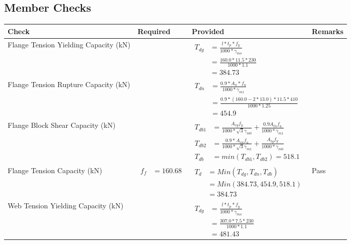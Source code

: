 \documentclass{article}%
\begin{document}
\subsection{Member Checks}%
\label{subsec:MemberChecks}%
\renewcommand{\arraystretch}{1.2}%
\begin{longtable}{|p{4cm}|p{6cm}|p{5.5cm}|p{1.5cm}|}%
\hline%
\rowcolor{OsdagGreen}%
Check&Required&Provided&Remarks\\%
\hline%
\endhead%
\hline%
Flange Tension Yielding Capacity (kN)&&$\begin{aligned} T_{dg} &= \frac{l*t_p*f_y}{1000*\gamma_{mo}}\\ &=\frac{160.0*11.5*230}{1000*1.1}\\ &=384.73\end{aligned}$&\\%
\hline%
Flange Tension Rupture Capacity (kN)&&$\begin{aligned} T_{dn} &= \frac{0.9*A_{n}*f_u}{1000*\gamma_{m1}}\\ &=\frac{0.9*(160.0-2*13.0)*11.5*410}{1000*1.25}\\ &=454.9\end{aligned}$&\\%
\hline%
Flange Block Shear Capacity (kN)&&$\begin{aligned}T_{db1} &= \frac{A_{vg} f_{y}}{1000*\sqrt{3} \gamma_{m0}} + \frac{0.9 A_{tn} f_{u}}{1000*\gamma_{m1}}\\ T_{db2} &= \frac{0.9*A_{vn} f_{u}}{1000*\sqrt{3} \gamma_{m1}} + \frac{A_{tg} f_{y}}{1000*\gamma_{m0}}\\ T_{db} &= min(T_{db1}, T_{db2})= 518.1\end{aligned}$&\\%
\hline%
Flange Tension Capacity (kN)&$\begin{aligned} f_f &=160.68 \end{aligned}$&$\begin{aligned} T_d &= Min(T_{dg},T_{dn},T_{db})\\ &= Min(384.73,454.9,518.1)\\ &=384.73\end{aligned}$&Pass\\%
\hline%
Web Tension Yielding Capacity (kN)&&$\begin{aligned} T_{dg} &= \frac{l*t_p*f_y}{1000*\gamma_{mo}}\\ &=\frac{307.0*7.5*230}{1000*1.1}\\ &=481.43\end{aligned}$&\\%

\end{longtable}
\end{document}
